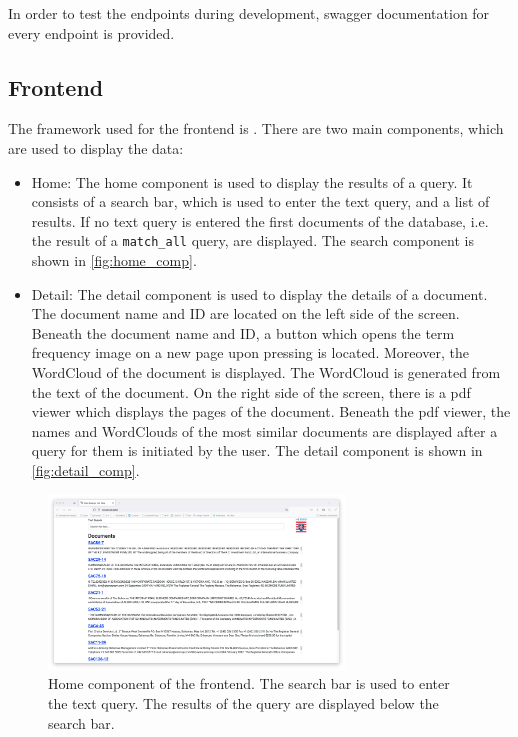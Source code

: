 In order to test the endpoints during development, swagger documentation for every endpoint is provided.





\subsection{Frontend}\label{subsec:frontend}

The framework used for the frontend is \angular{}.
There are two main components, which are used to display the data:

\begin{itemize}
    \item \label{pt:home}Home: 
        The home component is used to display the results of a query.
        It consists of a search bar, which is used to enter the text query, and a list of results.
        If no text query is entered the first documents of the database, i.e. the result of a \texttt{match\_all} query, are displayed.
        The search component is shown in \autoref{fig:home_comp}.

    \item \label{pt:detail}Detail: 
        The detail component is used to display the details of a document.
        The document name and ID are located on the left side of the screen.
        Beneath the document name and ID, a button which opens the term frequency image on a new page upon pressing is located. 
        Moreover, the WordCloud of the document is displayed.
        The WordCloud is generated from the text of the document.
        On the right side of the screen, there is a \ac{pdf} viewer which displays the pages of the document.
        Beneath the \ac{pdf} viewer, the names and WordClouds of the most similar documents are displayed after a query for them is initiated by the user.
        The detail component is shown in \autoref{fig:detail_comp}.
\end{itemize}


\begin{figure}[htp] %
    \centering
    \includegraphics[width=0.7\textwidth]{images/UI/Home_component.png}
    \caption{Home component of the frontend.
    The search bar is used to enter the text query.
    The results of the query are displayed below the search bar.
    }
    \label{fig:home_comp}
\end{figure}


